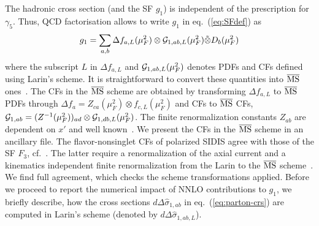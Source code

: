 \documentclass[%
 twocolumn,
 superscriptaddress,
 preprintnumbers,
 nofootinbib,
 amsmath,amssymb,
 aps,
 prl,
]{revtex4}
\begin{document}
{The hadronic cross section (and the SF $g_1$) is independent of the prescription for $\gamma_5$.
Thus, QCD factorisation allows to write $g_1$ in eq.~(\ref{eq:SFdef}) as 
%
\begin{align}
\label{eq:larinG}
g_1 = \sum_{a,b} \Delta f_{a,L}(\mu_F^2)\otimes  {\cal G}_{1,ab,L}(\mu_F^2) \tilde \otimes D_b(\mu_F^2)
\end{align}
%
where the subscript $L$ in $\Delta f_{a,L}$ and ${\cal G}_{1,ab,L}(\mu_F^2)$ 
denotes PDFs and CFs 
defined using Larin's scheme. 
It is straightforward to convert these quantities into $\overline{\rm{MS}}$ ones~\cite{Moch:2014sna}.  
The CFs in the ${\overline{\rm{MS}}}$ scheme are obtained by transforming 
$\Delta f_{a,L}$ to $\overline{\rm{MS}}$ PDFs through $\Delta f_{a}= Z_{ca}(\mu_F^2) \otimes f_{c,L}(\mu_F^2)$ and CFs to $\overline{\rm{MS}}$ CFs, ${\cal G}_{1,ab}= (Z^{-1}(\mu_F^2))_{ad}\otimes  {\cal G}_{1,db,L} (\mu_F^2)$.  
The finite renormalization constants $Z_{ab}$ are dependent on $x'$ and well known~\cite{Matiounine:1998re,Ravindran:2003gi,Moch:2014sna}.
We present the CFs in the $\overline{\rm{MS}}$ scheme in an ancillary file. 
The flavor-nonsinglet CFs of polarized SIDIS agree with those of the SF $F_3$, cf.~\cite{Goyal:2024xxx}.
The latter require a renormalization of the axial current and a kinematics independent finite renormalization from the Larin to the $\overline{\rm{MS}}$ scheme~\cite{Larin:1993tp,Ahmed:2015qpa}.
We find full agreement, which checks the scheme transformations applied.
Before we proceed to report the numerical impact of NNLO contributions to $g_1$, we briefly describe, how the cross sections $d \Delta \hat{\sigma}_{1,ab}$ in eq.~(\ref{eq:parton-crs}) are computed in Larin's scheme (denoted by $d \Delta \hat{\sigma}_{1,ab,L}$).  


}
\end{document}
